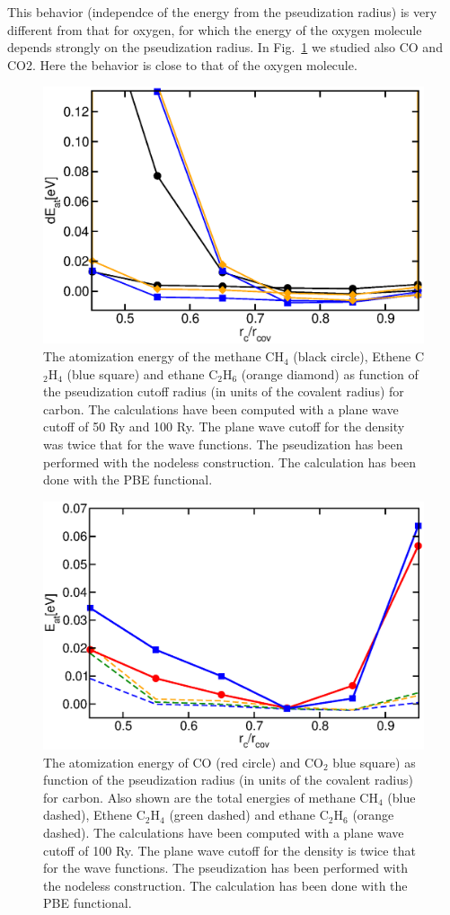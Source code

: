 \documentclass[11pt,a4paper]{report}
\begin{document}
This behavior (independce of the energy from the pseudization radius)
is very different from that for oxygen, for which the energy of the
oxygen molecule depends strongly on the pseudization radius. In
Fig.~\ref{c_setuptest} we studied also CO and CO2. Here the behavior
is close to that of the oxygen molecule.


\begin{figure}[h!]
\begin{center}
\includegraphics[width=0.5\linewidth,clip=true]
{Figs/C_setuptest/eofrc.eps}
\end{center}
\caption{\label{c_setuptest}The atomization energy of the methane
  CH$_4$ (black circle), Ethene C$_2$H$_4$ (blue square) and ethane
  C$_2$H$_6$ (orange diamond) as function of the pseudization cutoff
  radius (in units of the covalent radius) for carbon.  The
  calculations have been computed with a plane wave cutoff of 50 Ry
  and 100 Ry. The plane wave cutoff for the density was twice that for
  the wave functions. The pseudization has been performed with the
  nodeless construction. The calculation has been done with the PBE
  functional.}
\end{figure}


\begin{figure}[h!]
\begin{center}
\includegraphics[width=0.5\linewidth,clip=true]
{Figs/C_setuptest/eofrc_100ry_withcoandco2.eps}
\end{center}
\caption{\label{c_setuptest1}The atomization energy of CO (red circle)
  and CO$_2$ blue square) as function of the pseudization radius (in
  units of the covalent radius) for carbon.  Also shown are the total
  energies of methane CH$_4$ (blue dashed), Ethene C$_2$H$_4$ (green
  dashed) and ethane C$_2$H$_6$ (orange dashed).  The calculations
  have been computed with a plane wave cutoff of 100 Ry. The plane
  wave cutoff for the density is twice that for the wave
  functions. The pseudization has been performed with the nodeless
  construction. The calculation has been done with the PBE
  functional.}
\end{figure}
\end{document}
